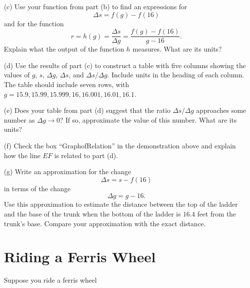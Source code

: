 \documentclass{ximera}
\begin{document}
\begin{example}
(c) Use your function from part (b) to find an expressions for
\[
  \Delta s = f(g) - f(16)
\]
and for the function
\[
  r = h(g) = \frac{\Delta s}{\Delta g} = \frac{f(g) - f(16)}{g-16} .
\]
Explain what the output of the function $h$ measures. What are its units?


(d) Use the results of part (c) to construct a table with five columns showing the values of $g$, $s$, $\Delta g$, $\Delta s$, and $\Delta s / \Delta g$. Include units in the heading of each column. The table should include seven rows, with $g=15.9,15.99, 15.999, 16, 16.001, 16.01, 16.1$.

(e) Does  your table from part (d) suggest that the ratio $\Delta s/ \Delta g$ approaches some number as $\Delta g \to 0$? If so, approximate the value of this number. What are its units?

(f) Check the box ``GraphofRelation'' in the demonstration above and explain how the line $EF$ is related to part (d).

(g) Write an approximation for the change
\[
   \Delta s = s- f(16)
\]
in terms of the change
\[
  \Delta g = g - 16 . 
\]  
Use this approximation to estimate the distance between the top of the ladder and the base of the trunk when the bottom of the ladder is $16.4$ feet from the trunk's base. Compare your approximation with the exact distance.

\end{example}





\section{Riding a Ferris Wheel}


Suppose  you ride a ferris wheel
\end{document}

